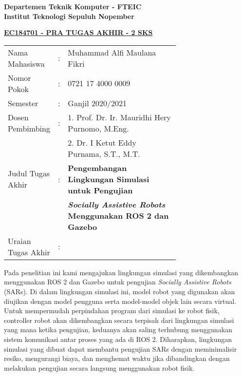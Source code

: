 \begin{flushleft}
  \textbf{Departemen Teknik Komputer - FTEIC}\\
  \textbf{Institut Teknologi Sepuluh Nopember}\\
\end{flushleft}

\begin{center}
  \underline{\textbf{EC184701 - PRA TUGAS AKHIR - 2 SKS}}
\end{center}

\begin{adjustwidth}{-0.2cm}{}
  \begin{tabular}{lcp{0.7\linewidth}}

    Nama Mahasiswa &:& Muhammad Alfi Maulana Fikri \\
    Nomor Pokok &:&	0721 17 4000 0009 \\

    Semester &:& Ganjil 2020/2021 \\

    Dosen Pembimbing &:& 1. Prof. Dr. Ir. Mauridhi Hery Purnomo, M.Eng. \\
    & & 2. Dr. I Ketut Eddy Purnama, S.T., M.T. \\

    Judul Tugas Akhir &:& \textbf{Pengembangan Lingkungan Simulasi untuk Pengujian} \\
    & & \textbf{\emph{Socially Assistive Robots} Menggunakan ROS 2 dan Gazebo} \\

    Uraian Tugas Akhir &:& \\
  \end{tabular}
\end{adjustwidth}

Pada penelitian ini kami mengajukan lingkungan simulasi yang dikembangkan menggunakan ROS 2 dan Gazebo untuk pengujian \emph{Socially Assistive Robots} (SARs).
Di dalam lingkungan simulasi ini, model robot yang digunakan akan diujikan dengan model pengguna serta model-model objek lain secara virtual.
Untuk mempermudah perpindahan program dari simulasi ke robot fisik, controller robot akan dikembangkan secara terpisah dari lingkungan simulasi yang mana ketika pengujian, keduanya akan saling terhubung menggunakan sistem komunikasi antar proses yang ada di ROS 2.
Diharapkan, lingkungan simulasi yang dibuat dapat membantu pengujian SARs dengan meminimalisir resiko, mengurangi biaya, dan menghemat waktu jika dibandingkan dengan melakukan pengujian secara langsung menggunakan robot fisik.
\vspace{1ex}


